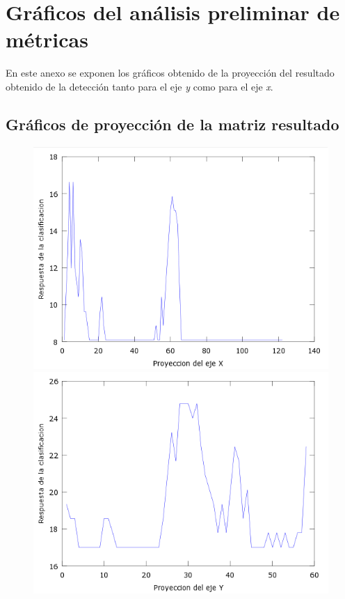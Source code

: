 \chapter{Gráficos del análisis preliminar de métricas}
\label{cap:gapm}


En este anexo se exponen los gráficos obtenido de la proyección del resultado obtenido de la detección tanto para el eje \textit{y} como para el eje \textit{x}.

\section{Gráficos de proyección de la matriz resultado}

\begin{figure}[H]
  \centering
  \includegraphics[scale=.4]{images/plots/boost1X}
  \includegraphics[scale=.4]{images/plots/boost1Y}

\end{figure}

